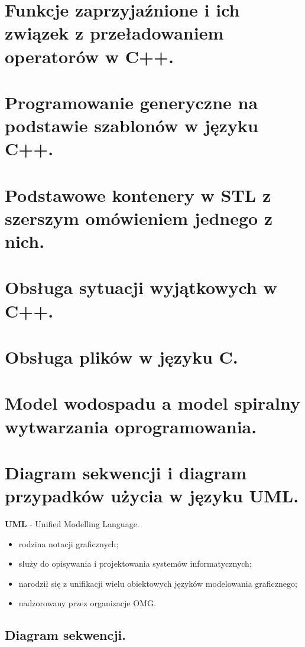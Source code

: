 \documentclass[12pt]{article}
\begin{document}
    \newpage
    
    \section{Funkcje zaprzyjaźnione i ich związek z przeładowaniem operatorów w C++.}
    \section{Programowanie generyczne na podstawie szablonów w języku C++.}
    \section{Podstawowe kontenery w STL z szerszym omówieniem jednego z nich.}
    \section{Obsługa sytuacji wyjątkowych w C++.}
    \section{Obsługa plików w języku C.}
    \section{Model wodospadu a model spiralny wytwarzania oprogramowania.}

    \newpage

    \section{Diagram sekwencji i diagram przypadków użycia w języku UML.}

    \begin{definition}
        \textbf{UML} - Unified Modelling Language.
        \begin{itemize}
            \item rodzina notacji graficznych;
            \item służy do opisywania i projektowania systemów informatycznych;
            \item narodził się z unifikacji wielu obiektowych języków modelowania graficznego;
            \item nadzorowany przez organizacje OMG.
        \end{itemize}
    \end{definition}

    \subsection{Diagram sekwencji.}
\end{document}
